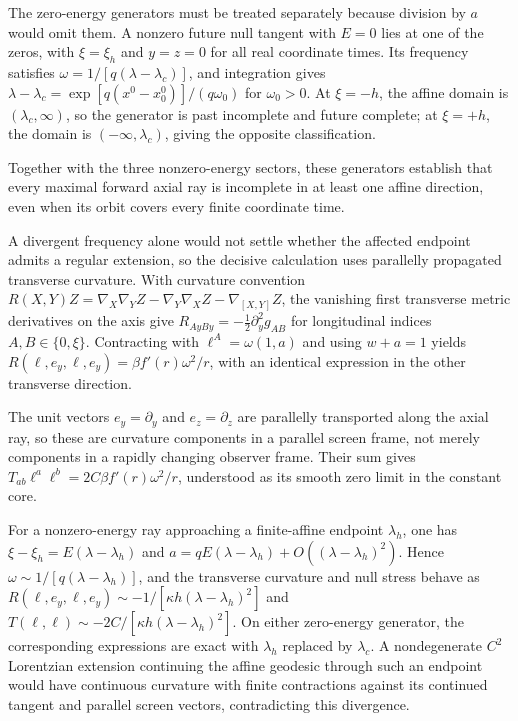 \documentclass[11pt]{article}
\begin{document}
The zero-energy generators must be treated separately because division by $a$ would omit them. A nonzero future null tangent with $E=0$ lies at one of the zeros, with $\xi=\xi_h$ and $y=z=0$ for all real coordinate times. Its frequency satisfies $\omega=1/[q(\lambda-\lambda_c)]$, and integration gives $\lambda-\lambda_c=\exp[q(x^0-x^0_0)]/(q\omega_0)$ for $\omega_0>0$. At $\xi=-h$, the affine domain is $(\lambda_c,\infty)$, so the generator is past incomplete and future complete; at $\xi=+h$, the domain is $(-\infty,\lambda_c)$, giving the opposite classification.

Together with the three nonzero-energy sectors, these generators establish that every maximal forward axial ray is incomplete in at least one affine direction, even when its orbit covers every finite coordinate time.

A divergent frequency alone would not settle whether the affected endpoint admits a regular extension, so the decisive calculation uses parallelly propagated transverse curvature. With curvature convention $R(X,Y)Z=\nabla_X\nabla_YZ-\nabla_Y\nabla_XZ-\nabla_{[X,Y]}Z$, the vanishing first transverse metric derivatives on the axis give $R_{AyBy}=-\tfrac12\partial_y^2g_{AB}$ for longitudinal indices $A,B\in\{0,\xi\}$. Contracting with $\ell^A=\omega(1,a)$ and using $w+a=1$ yields $R(\ell,e_y,\ell,e_y)=\beta f'(r)\omega^2/r$, with an identical expression in the other transverse direction.

The unit vectors $e_y=\partial_y$ and $e_z=\partial_z$ are parallelly transported along the axial ray, so these are curvature components in a parallel screen frame, not merely components in a rapidly changing observer frame. Their sum gives $T_{ab}\ell^a\ell^b=2C\beta f'(r)\omega^2/r$, understood as its smooth zero limit in the constant core.

For a nonzero-energy ray approaching a finite-affine endpoint $\lambda_h$, one has $\xi-\xi_h=E(\lambda-\lambda_h)$ and $a=qE(\lambda-\lambda_h)+O((\lambda-\lambda_h)^2)$. Hence $\omega\sim1/[q(\lambda-\lambda_h)]$, and the transverse curvature and null stress behave as $R(\ell,e_y,\ell,e_y)\sim-1/[\kappa h(\lambda-\lambda_h)^2]$ and $T(\ell,\ell)\sim-2C/[\kappa h(\lambda-\lambda_h)^2]$. On either zero-energy generator, the corresponding expressions are exact with $\lambda_h$ replaced by $\lambda_c$. A nondegenerate $C^2$ Lorentzian extension continuing the affine geodesic through such an endpoint would have continuous curvature with finite contractions against its continued tangent and parallel screen vectors, contradicting this divergence.
\end{document}

